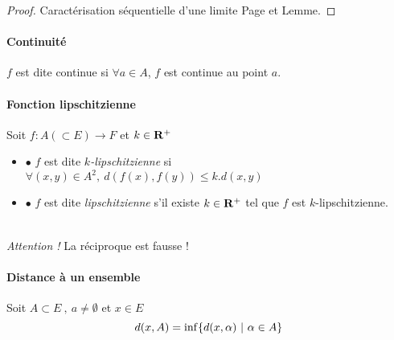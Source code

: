		 \medskip
		
		 \medskip
		
		
		\begin{proof}
		Caractérisation séquentielle d'une limite Page \pageref{CarSeqLim} et Lemme.
		\end{proof} \medskip
		
		\traitd
		\paragraph{Continuité}
			$f$ est dite continue si $\forall a\in A$, $f$ est continue au point $a$.
		\traitdouble
		\paragraph{Fonction lipschitzienne}
			Soit $f:A(\subset E) \rightarrow F$ et $k\in {\mathbf{R}}^+$
			\begin{itemize}
				\item $\bullet $ $f$ est dite \emph{$k$-lipschitzienne} si $\forall (x,y) \in A^2 ,~d(f(x),f(y)) \leq k.d(x,y)$
				\item $\bullet $ $f$ est dite \emph{lipschitzienne} s'il existe $k\in{\mathbf{R}}^+$ tel que $f$ est $k$-lipschitzienne.
			\end{itemize}
		\trait
		
		 \\
		{\small \emph{Attention !} La réciproque est fausse ! }
		
		
		\traitd
		\paragraph{Distance à un ensemble}
			Soit $A\subset E ~,~a\neq\emptyset$ et $x\in E$ 
			\[
				d(x,A) = \mathrm{inf}\{d(x,\alpha ) ~|~\alpha \in A \}
			\vspace{-20pt}
			\] 
		\trait
		
